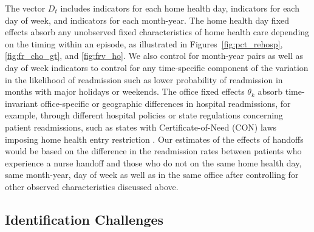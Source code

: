\documentclass[final,12pt, notitlepage]{article}
\begin{document}
The vector $D_t$ includes indicators for each home health day, indicators for each day of week, and indicators for each month-year.
The home health day fixed effects absorb any unobserved fixed characteristics of home health care depending on the timing within an episode, as illustrated in Figures~\ref{fig:pct_rehosp}, \ref{fig:fr_cho_gt}, and \ref{fig:frv_ho}.
We also control for month-year pairs as well as day of week indicators to control for any time-specific component of the variation in the likelihood of readmission such as lower probability of readmission in months with major holidays or weekends.
The office fixed effects $\theta_k$ absorb time-invariant office-specific or geographic differences in hospital readmissions, for example, through different hospital policies or state regulations concerning patient readmissions, such as states with Certificate-of-Need (CON) laws imposing home health entry restriction \citep{Polsky2014}.
Our estimates of the effects of handoffs would be based on the difference in the readmission rates between patients who experience a nurse handoff and those who do not on the same home health day, same month-year, day of week as well as in the same office after controlling for other observed characteristics discussed above.



\subsection{Identification Challenges} \label{sec:id_challenges}
\end{document}
